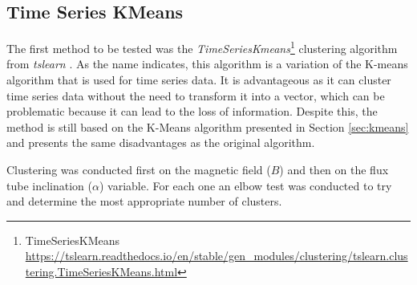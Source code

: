 \subsection{Time Series KMeans}\label{sec:time_series_methods}
The first method to be tested was the \textit{TimeSeriesKmeans}\footnote{TimeSeriesKMeans \url{https://tslearn.readthedocs.io/en/stable/gen_modules/clustering/tslearn.clustering.TimeSeriesKMeans.html}} clustering algorithm from \textit{tslearn} \cite{tslearn}. As the name indicates, this algorithm is a variation of the K-means algorithm that is used for time series data. It is advantageous as it can cluster time series data without the need to transform it into a vector, which can be problematic because it can lead to the loss of information. Despite this, the method is still based on the K-Means algorithm presented in Section \ref{sec:kmeans} and presents the same disadvantages as the original algorithm. 

Clustering was conducted first on the magnetic field ($B$) and then on the flux tube inclination ($\alpha$) variable. For each one an elbow test was conducted to try and determine the most appropriate number of clusters. 

